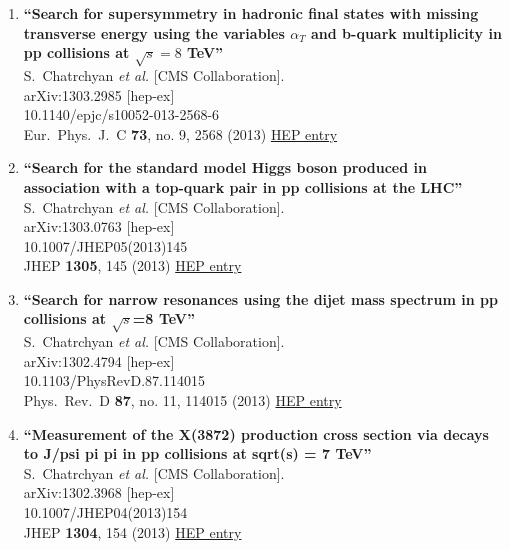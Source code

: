 \documentclass{article}
\begin{document}
\begin{enumerate}
\item%
{\bf ``Search for supersymmetry in hadronic final states with missing transverse energy using the variables $\alpha_T$ and b-quark multiplicity in pp collisions at $\sqrt s=8$ TeV''}
  \\{}S.~Chatrchyan {\it et al.} [CMS Collaboration].
  \\{}arXiv:1303.2985 [hep-ex]
    \\{}10.1140/epjc/s10052-013-2568-6
\\{}Eur.\ Phys.\ J.\ C {\bf 73}, no. 9, 2568 (2013) %
\href{http://inspirehep.net/record/1223519}{HEP entry}


\item%
{\bf ``Search for the standard model Higgs boson produced in association with a top-quark pair in pp collisions at the LHC''}
  \\{}S.~Chatrchyan {\it et al.} [CMS Collaboration].
  \\{}arXiv:1303.0763 [hep-ex]
    \\{}10.1007/JHEP05(2013)145
\\{}JHEP {\bf 1305}, 145 (2013) %
\href{http://inspirehep.net/record/1222336}{HEP entry}


\item%
{\bf ``Search for narrow resonances using the dijet mass spectrum in pp collisions at $\sqrt{s}$=8  TeV''}
  \\{}S.~Chatrchyan {\it et al.} [CMS Collaboration].
  \\{}arXiv:1302.4794 [hep-ex]
    \\{}10.1103/PhysRevD.87.114015
\\{}Phys.\ Rev.\ D {\bf 87}, no. 11, 114015 (2013) %
\href{http://inspirehep.net/record/1220378}{HEP entry}


\item%
{\bf ``Measurement of the X(3872) production cross section via decays to J/psi pi pi in pp collisions at sqrt(s) = 7 TeV''}
  \\{}S.~Chatrchyan {\it et al.} [CMS Collaboration].
  \\{}arXiv:1302.3968 [hep-ex]
    \\{}10.1007/JHEP04(2013)154
\\{}JHEP {\bf 1304}, 154 (2013) %
\href{http://inspirehep.net/record/1219950}{HEP entry}



\end{enumerate}
\end{document}
